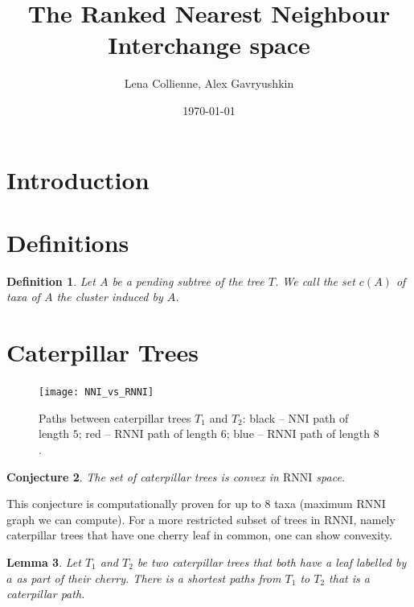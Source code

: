\documentclass[11pt, a4paper]{article}
\title{The Ranked Nearest Neighbour Interchange space}
\date{\today}
\author{Lena Collienne, Alex Gavryushkin}
\newcommand{\nni}{\mathrm{NNI}}
\newcommand{\rnni}{\mathrm{RNNI}}
\newtheorem{definition}{Definition}
\newtheorem{conjecture}[definition]{Conjecture}
\newtheorem{lemma}[definition]{Lemma}
\begin{document}
\maketitle

\begin{abstract}

\end{abstract}


\section{Introduction}

\section{Definitions}





\begin{definition}
	Let $A$ be a pending subtree of the tree $T$.
	We call the set $c(A)$ of taxa of $A$ the \emph{cluster} induced by $A$.
\end{definition}

\section{Caterpillar Trees}

\begin{figure}[H]
	\centering
	\texttt{[image: NNI\_vs\_RNNI]}
	\caption{Paths between caterpillar trees $T_1$ and $T_2$: black -- $\nni$ path of length $5$; red -- $\rnni$ path of length $6$; blue -- $\rnni$ path of length $8$.}
	\label{NNI_vs_RNNI}
\end{figure}

\begin{conjecture}
	The set of caterpillar trees is convex in $\rnni$ space.
\end{conjecture}

This conjecture is computationally proven for up to $8$ taxa (maximum $\rnni$ graph we can compute).
For a more restricted subset of trees in $\rnni$, namely caterpillar trees that have one cherry leaf in common, one can show convexity.

\begin{lemma}
	Let $T_1$ and $T_2$ be two caterpillar trees that both have a leaf labelled by $a$ as part of their cherry.
	There is a shortest paths from $T_1$ to $T_2$ that is a caterpillar path.
	\label{lemma:caterpillar_subset_convex}
\end{lemma}
\end{document}
